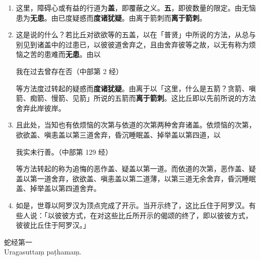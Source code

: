 \begin{enumerate}\item 这里，障碍心或有益的行道为\textbf{盖}，即覆蔽之义。\textbf{五}，即彼数量的限定。由无恼患为\textbf{无患}。由已度疑惑而\textbf{度诸犹疑}。由离于箭刺而\textbf{离于箭刺}。
\item 这是说的什么？若比丘对欲欲等的五盖，以在「普贤」中所说的方法，从总与别见到诸盖中的过患已，以彼彼道舍弃之，且由舍弃彼等之故，以无有称为烦恼之苦的患难而\textbf{无患}。由以\begin{quoting}我在过去曾存在否（中部第 2 经）\end{quoting}等方法度过转起的疑惑而\textbf{度诸犹疑}。由离于以「这里，什么是五箭？贪箭、嗔箭、痴箭、慢箭、见箭」所说的五箭而\textbf{离于箭刺}。这比丘即以先前所说的方法舍弃此岸彼岸。
\item 且此处，当知也有依烦恼的次第与依道的次第两种舍弃诸盖。依烦恼的次第，欲欲盖、嗔恚盖以第三道舍弃，昏沉睡眠盖、掉举盖以第四道，以\begin{quoting}我实未行善。（中部第 129 经）\end{quoting}等方法转起的称为追悔的恶作盖、疑盖以第一道。而依道的次第，恶作盖、疑盖以第一道舍弃，欲欲盖、嗔恚盖以第二道薄，以第三道无余舍弃，昏沉睡眠盖、掉举盖以第四道舍弃。
\item 如是，世尊以阿罗汉为顶点完成了开示。当开示终了，这比丘住于阿罗汉。有些人说：「以彼彼方式，在对这些比丘所开示的偈颂的终了，即以彼彼方式，彼彼比丘住于阿罗汉。」\end{enumerate}

\begin{center}\vspace{1em}蛇经第一\\Uragasuttaṃ paṭhamaṃ.\end{center}

